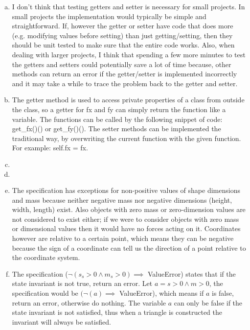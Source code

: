 \documentclass[12pt]{article}
\begin{document}
\begin{enumerate}[a)]

\item 
	I don’t think that testing getters and setter is necessary for small projects. In small projects the implementation would typically be simple and straightforward. If, however the getter or setter have code that does more (e.g. modifying values before setting) than just getting/setting, then they should be unit tested to make sure that the entire code works. Also, when dealing with larger projects, I think that spending a few more minutes to test the getters and setters could potentially save a lot of time because, other methods can return an error if the getter/setter is implemented incorrectly and it may take a while to trace the problem back to the getter and setter.

\item
	The getter method is used to access private properties of a class from outside the class, so a getter for fx and fy can simply return the function like a variable. The functions can be called by the following snippet of code: get\_fx()() or get\_fy()(). The setter methods can be implemented the traditional way, by overwriting the current function with the given function. For example: self.fx = fx.

\item
	

\item
	

\item
	The specification has exceptions for non-positive values of shape dimensions and mass because neither negative mass nor negative dimensions (height, width, length) exist. Also objects with zero mass or zero-dimension values are not considered to exist either; if we were to consider objects with zero mass or dimensional values then it would have no forces acting on it. Coordinates however are relative to a certain point, which means they can be negative because the sign of a coordinate can tell us the direction of a point relative to the coordinate system. 

\item
	The specification ($\neg(s_s > 0 \wedge m_s > 0) \implies$ ValueError) states that if the state invariant is not true, return an error. Let $a = s > 0 \wedge m > 0$, the specification would be $(\neg(a) \implies$ ValueError), which means if $a$ is false, return an error, otherwise do nothing. The variable $a$ can only be false if the state invariant is not satisfied, thus when a triangle is constructed the invariant will always be satisfied.


\end{enumerate}
\end{document}
